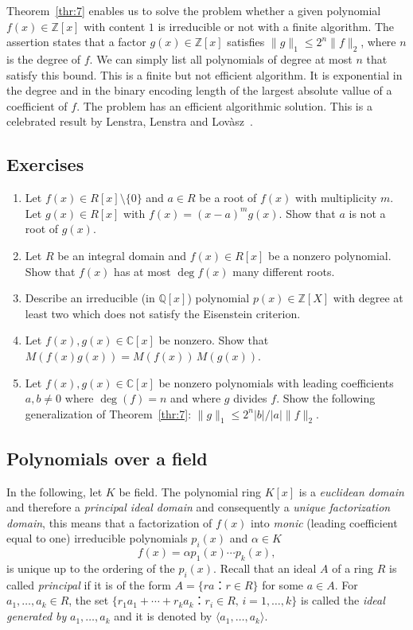 Theorem~\ref{thr:7} enables us to solve the problem whether a given polynomial $f(x) ∈ℤ[x]$  with content $1$ is irreducible or not with a finite algorithm. The assertion states that a factor $g(x) ∈ℤ[x]$ satisfies $\|g\|_1 ≤ 2^n \|f\|_2$, where $n$ is the degree of $f$. We can simply list all polynomials of degree at most $n$ that satisfy this bound. This is a finite but not efficient algorithm. It is exponential in the degree and in the binary encoding length of the largest absolute vallue of a coefficient of $f$. The problem has an efficient algorithmic solution. This is a celebrated result by Lenstra, Lenstra and Lovàsz~\cite{lenstra1982factoring}.  


\subsection*{Exercises}
\begin{enumerate}
\item Let $f(x) ∈ R[x]\setminus\{0\}$ and $a ∈R$ be a root of $f(x)$ with multiplicity $m$. Let $g(x) ∈ R[x] $ with $f(x) = (x-a)^m g(x)$. Show that $a$ is not a root of $g(x)$.
\item Let $R$ be an integral domain and  $f(x) ∈ R[x]$ be a nonzero polynomial. Show that $f(x)$ has at most $\deg f(x)$ many different roots.
\item Describe an irreducible (in $ℚ[x]$) polynomial $p(x) ∈ℤ[X]$ with degree at least two which does not satisfy the Eisenstein criterion.
\item Let  $f(x),g(x) ∈ℂ[x]$ be nonzero. Show that $M(f(x)g(x)) = M(f(x)) \, M (g(x))$.
\item Let $f(x),g(x) ∈ℂ[x]$ be nonzero polynomials with leading coefficients $a,b ≠0$ where $\deg (f) = n$ and where $g$ divides $f$. Show the following generalization of Theorem~\ref{thr:7}: $\|g\|_1 ≤ 2^n |b| / |a| \|f\|_2$. 
\end{enumerate}


\subsection{Polynomials over a field}
\label{sec:polyn-with-coeff}

In the following, let $K$ be field. The polynomial ring $K[x]$ is a \emph{euclidean domain} and therefore a \emph{principal ideal domain} and consequently a \emph{unique factorization domain}, this means that a factorization of $f(x)$ into \emph{monic} (leading coefficient equal to one) irreducible polynomials $p_i(x)$  and $α ∈K$ 
\begin{equation}
  \label{eq:3}
  f(x) = α p_1(x) \cdots p_k(x), 
\end{equation}
is unique up to the ordering of the $p_i(x)$. Recall that an ideal $A$ of a ring  $R$  is called \emph{principal} if it is of the form $A = \{ r a ： r ∈R\}$ for some $a ∈A$. For $a_1,\dots,a_k ∈R$, the set  $\{ r_1 a_1+ \cdots + r_k a_k ： r_i ∈R, \, i=1,\dots,k\}$ is called the \emph{ideal generated by} $a_1,\dots,a_k$ and it is  denoted by $〈a_1,\dots,a_k〉$. 

